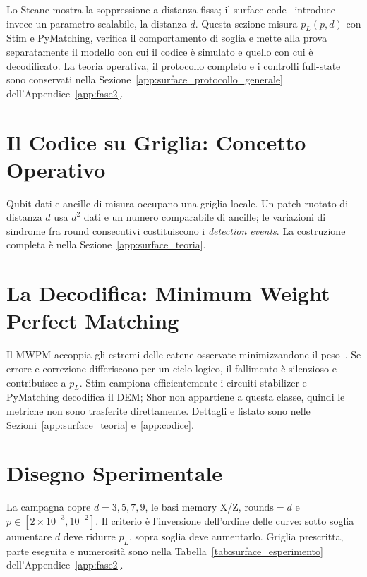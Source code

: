 \begin{onehalfspace}

Lo Steane mostra la soppressione a distanza fissa; il surface
code~\cite{kitaev2003,fowler2012} introduce invece un parametro scalabile,
la distanza $d$. Questa sezione misura $p_L(p,d)$ con Stim e PyMatching,
verifica il comportamento di soglia e mette alla prova separatamente il
modello con cui il codice è simulato e quello con cui è decodificato. La
teoria operativa, il protocollo completo e i controlli full-state sono
conservati nella Sezione~\ref{app:surface_protocollo_generale}
dell'Appendice~\ref{app:fase2}.

\section{Il Codice su Griglia: Concetto Operativo}
\label{sec:surface_concetto}

Qubit dati e ancille di misura occupano una griglia locale. Un patch
ruotato di distanza $d$ usa $d^2$ dati e un numero comparabile di ancille;
le variazioni di sindrome fra round consecutivi costituiscono i
\emph{detection events}. La costruzione completa è nella
Sezione~\ref{app:surface_teoria}.

\section{La Decodifica: Minimum Weight Perfect Matching}
\label{sec:mwpm}

Il \ac{MWPM} accoppia gli estremi delle catene osservate minimizzandone il
peso~\cite{pymatching2021}. Se errore e correzione differiscono per un
ciclo logico, il fallimento è silenzioso e contribuisce a $p_L$. Stim
campiona efficientemente i circuiti stabilizer e PyMatching decodifica il
\ac{DEM}; Shor non appartiene a questa classe, quindi le metriche non sono
trasferite direttamente. Dettagli e listato sono nelle
Sezioni~\ref{app:surface_teoria} e~\ref{app:codice}.

\section{Disegno Sperimentale}
\label{sec:surface_esperimento}

La campagna copre $d=3,5,7,9$, le basi memory X/Z,
$\mathrm{rounds}=d$ e $p\in[2\times10^{-3},10^{-2}]$. Il criterio è
l'inversione dell'ordine delle curve: sotto soglia aumentare $d$ deve
ridurre $p_L$, sopra soglia deve aumentarlo. Griglia prescritta, parte
eseguita e numerosità sono nella Tabella~\ref{tab:surface_esperimento}
dell'Appendice~\ref{app:fase2}.


\end{onehalfspace}
